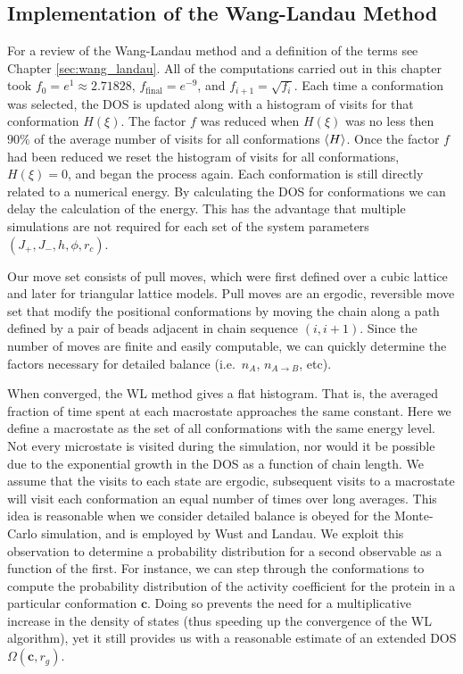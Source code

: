 \subsection{Implementation of the Wang-Landau Method}

For a review of the Wang-Landau method and a definition of the terms see Chapter \ref{sec:wang_landau}. All of the computations carried out in this chapter took $f_0 = e^{1} \approx 2.71828$, $f_{\text{final}}= e^{-9}$, and $f_{i+1} = \sqrt{ f_{i} }$. Each time a conformation was selected, the DOS is updated along with a histogram of visits for that conformation $H(\xi)$. The factor $f$ was reduced when $H(\xi)$ was no less then $90\%$ of the average number of visits for all conformations $\left< H \right>$. Once the factor $f$ had been reduced we reset the histogram of visits for all conformations, $H(\xi)=0$, and began the process again. Each conformation is still directly related to a numerical energy. By calculating the DOS for conformations we can delay the calculation of the energy. This has the advantage that multiple simulations are not required for each set of the system parameters $(J_+, J_-, h, \phi, r_c)$.

Our move set consists of pull moves, which were first defined over a cubic lattice \cite{lesh_complete_2003} and later for triangular lattice models.\cite{bockenhauer_local_2008} Pull moves are an ergodic, reversible move set that modify the positional conformations by moving the chain along a path defined by a pair of beads adjacent in chain sequence $(i, i+1)$. Since the number of moves are finite and easily computable, we can quickly determine the factors necessary for detailed balance (i.e.\ $n_A$, $n_{A \to B}$, etc).

When converged, the WL method gives a flat histogram. That is, the averaged fraction of time spent at each macrostate approaches the same constant. Here we define a macrostate as the set of all conformations with the same energy level. Not every microstate is visited during the simulation, nor would it be possible due to the exponential growth in the DOS as a function of chain length. We assume that the visits to each state are ergodic, subsequent visits to a macrostate will visit each conformation an equal number of times over long averages. This idea is reasonable when we consider detailed balance is obeyed for the Monte-Carlo simulation, and is employed by Wust and Landau.\cite{wust_versatile_2009} We exploit this observation to determine a probability distribution for a second observable as a function of the first. For instance, we can step through the conformations to compute the probability distribution of the activity coefficient for the protein in a particular conformation $\mathbf{c}$. Doing so prevents the need for a multiplicative increase in the density of states (thus speeding up the convergence of the WL algorithm), yet it still provides us with a reasonable estimate of an extended DOS $\Omega(\mathbf{c}, r_g)$.

